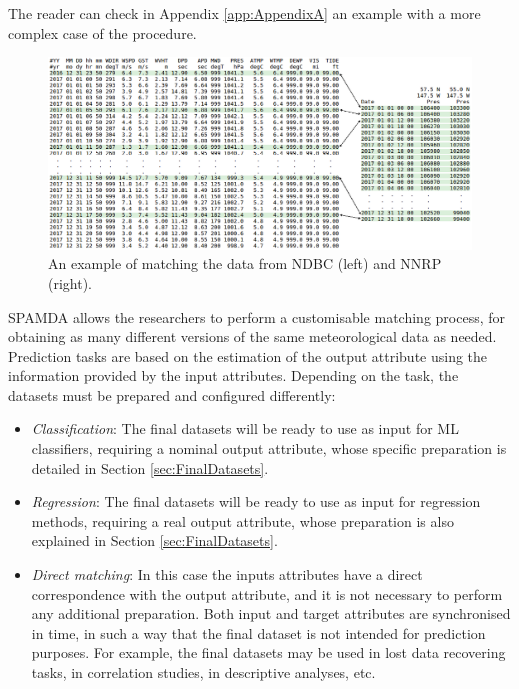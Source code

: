 \documentclass[energies,article,submit,moreauthors,pdftex]{Definitions/mdpi}
\begin{document}
				The reader can check in Appendix \ref{app:AppendixA} an example with a more complex case of the procedure.
				\begin{figure}[H]
					\centering
					\includegraphics[scale=0.38]{figures/FigureMatchingProcess.png}
					\caption{An example of matching the data from NDBC (left) and NNRP (right).}
					\label{fig:matchingProcess}
				\end{figure}
				
				SPAMDA allows the researchers to perform a customisable matching process, for obtaining as many different versions of the same meteorological data as needed.
				Prediction tasks are based on the estimation of the output attribute using the information provided by the input attributes. Depending on the task, the datasets must be prepared and configured differently:				
				\begin{itemize}[leftmargin=*,labelsep=5.8mm]
					\item \textit{Classification}: The final datasets will be ready to use as input for ML classifiers, requiring a nominal output attribute, whose specific preparation is detailed in Section \ref{sec:FinalDatasets}.
					\item \textit{Regression}: The final datasets will be ready to use as input for regression methods, requiring a real output attribute, whose preparation is also explained in Section \ref{sec:FinalDatasets}.
					\item \textit{Direct matching}: In this case the inputs attributes have a direct correspondence with the output attribute, and it is not necessary to perform any additional preparation. Both input and target attributes are synchronised in time, in such a way that the final dataset is not intended for prediction purposes. For example, the final datasets may be used in lost data recovering tasks, in correlation studies, in descriptive analyses, etc.
				\end{itemize}
				
\end{document}

